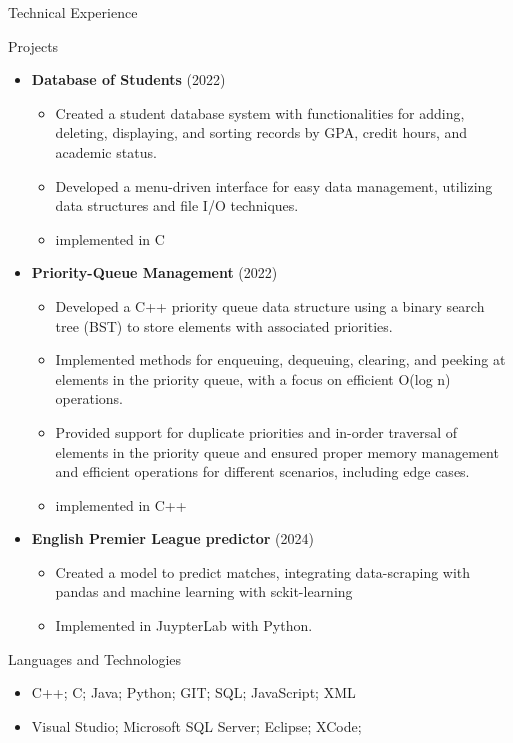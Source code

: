 \documentclass[]{mcdowellcv}
\begin{document}
	\begin{cvsection}{Technical Experience}
		\begin{cvsubsection}{Projects}{}{}
			\begin{itemize}
				\item \textbf{Database of Students} (2022)
				\begin{itemize}
					\item Created a student database system with functionalities for adding, deleting, displaying, and sorting records by GPA, credit hours, and academic status.
					\item Developed a menu-driven interface for easy data management, utilizing data structures and file I/O techniques.
					\item implemented in C
				\end{itemize}

				\item \textbf{Priority-Queue Management} (2022)
				\begin{itemize}
					\item Developed a C++ priority queue data structure using a binary search tree (BST) to store elements with associated priorities.
					\item Implemented methods for enqueuing, dequeuing, clearing, and peeking at elements in the priority queue, with a focus on efficient O(log n) operations.
					\item Provided support for duplicate priorities and in-order traversal of elements in the priority queue and ensured proper memory management and efficient operations for different scenarios, including edge cases.
					\item implemented in C++
				\end{itemize}

				\item \textbf{English Premier League predictor} (2024)
				\begin{itemize}
					\item Created a model to predict matches, integrating data-scraping with pandas and machine learning with sckit-learning
					\item Implemented in JuypterLab with Python.
				\end{itemize}
			\end{itemize}
		\end{cvsubsection}
	\end{cvsection}
	
	\begin{cvsection}{Languages and Technologies}
		\begin{cvsubsection}{}{}{}	
			\begin{itemize}
				\item C++; C; Java; Python; GIT; SQL; JavaScript; XML 
				\item Visual Studio; Microsoft SQL Server; Eclipse; XCode;
			\end{itemize}
		\end{cvsubsection}
	\end{cvsection}
	
\end{document}
